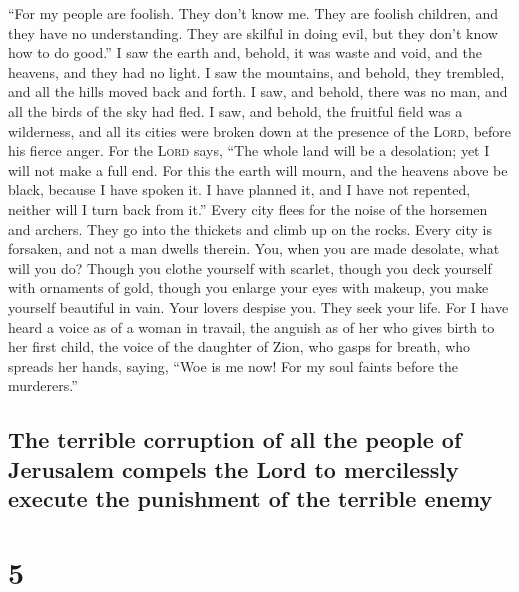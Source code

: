  ``For my people are foolish. They don't know me. They
are foolish children, and they have no understanding. They are skilful
in doing evil, but they don't know how to do good.''  I
saw the earth and, behold, it was waste and void, and the heavens, and
they had no light.  I saw the mountains, and behold, they
trembled, and all the hills moved back and forth.  I saw,
and behold, there was no man, and all the birds of the sky had fled.
 I saw, and behold, the fruitful field was a wilderness,
and all its cities were broken down at the presence of the
\textsc{Lord}, before his fierce anger.  For the
\textsc{Lord} says, ``The whole land will be a desolation; yet I will
not make a full end.  For this the earth will mourn, and
the heavens above be black, because I have spoken it. I have planned it,
and I have not repented, neither will I turn back from it.''
 Every city flees for the noise of the horsemen and
archers. They go into the thickets and climb up on the rocks. Every city
is forsaken, and not a man dwells therein.  You, when you
are made desolate, what will you do? Though you clothe yourself with
scarlet, though you deck yourself with ornaments of gold, though you
enlarge your eyes with makeup, you make yourself beautiful in vain. Your
lovers despise you. They seek your life.  For I have
heard a voice as of a woman in travail, the anguish as of her who gives
birth to her first child, the voice of the daughter of Zion, who gasps
for breath, who spreads her hands, saying, ``Woe is me now! For my soul
faints before the murderers.''

\hypertarget{the-terrible-corruption-of-all-the-people-of-jerusalem-compels-the-lord-to-mercilessly-execute-the-punishment-of-the-terrible-enemy}{%
\subsection{The terrible corruption of all the people of Jerusalem
compels the Lord to mercilessly execute the punishment of the terrible
enemy}\label{the-terrible-corruption-of-all-the-people-of-jerusalem-compels-the-lord-to-mercilessly-execute-the-punishment-of-the-terrible-enemy}}

\hypertarget{section-4}{%
\section{5}\label{section-4}}

